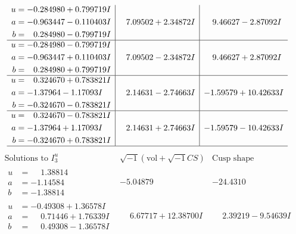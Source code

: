 \documentclass[1p]{elsarticle_modified}
\theoremstyle{definition}
\newcommand{\I}{\sqrt{-1}}
\begin{document}
$$\begin{array}{c|c|c}
\begin{aligned}
u &= -0.284980 + 0.799719 I \\
a &= -0.963447 - 0.110403 I \\
b &= \phantom{-}0.284980 - 0.799719 I\end{aligned}
 & \phantom{-}7.09502 + 2.34872 I & \phantom{-}9.46627 - 2.87092 I \\ \hline\begin{aligned}
u &= -0.284980 - 0.799719 I \\
a &= -0.963447 + 0.110403 I \\
b &= \phantom{-}0.284980 + 0.799719 I\end{aligned}
 & \phantom{-}7.09502 - 2.34872 I & \phantom{-}9.46627 + 2.87092 I \\ \hline\begin{aligned}
u &= \phantom{-}0.324670 + 0.783821 I \\
a &= -1.37964 - 1.17093 I \\
b &= -0.324670 - 0.783821 I\end{aligned}
 & \phantom{-}2.14631 - 2.74663 I & -1.59579 + 10.42633 I \\ \hline\begin{aligned}
u &= \phantom{-}0.324670 - 0.783821 I \\
a &= -1.37964 + 1.17093 I \\
b &= -0.324670 + 0.783821 I\end{aligned}
 & \phantom{-}2.14631 + 2.74663 I & -1.59579 - 10.42633 I\\
 \hline 
 \end{array}$$\newpage$$\begin{array}{c|c|c}  
\text{Solutions to }I^u_{3}& \I (\text{vol} + \sqrt{-1}CS) & \text{Cusp shape}\\
 \hline 
\begin{aligned}
u &= \phantom{-}1.38814\phantom{ +0.000000I} \\
a &= -1.14584\phantom{ +0.000000I} \\
b &= -1.38814\phantom{ +0.000000I}\end{aligned}
 & -5.04879\phantom{ +0.000000I} & -24.4310\phantom{ +0.000000I} \\ \hline\begin{aligned}
u &= -0.49308 + 1.36578 I \\
a &= \phantom{-}0.71446 + 1.76339 I \\
b &= \phantom{-}0.49308 - 1.36578 I\end{aligned}
 & \phantom{-}6.67717 + 12.38700 I & \phantom{-}2.39219 - 9.54639 I \\ \hline\begin{aligned}

\end{aligned}
\end{array}$$
\end{document}
